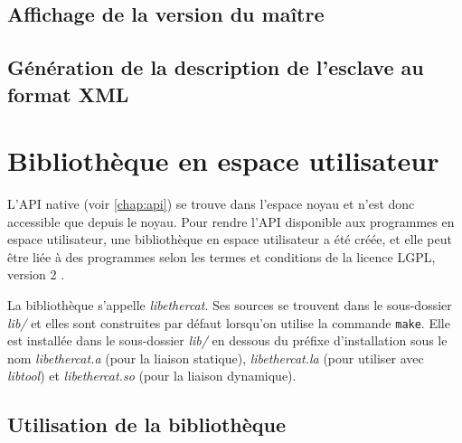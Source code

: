 \documentclass[a4paper,12pt,BCOR6mm,bibtotoc,idxtotoc]{scrbook}
\begin{document}



\subsection{Affichage de la version du ma\^itre}




\subsection{G\'en\'eration de la description de l'esclave au format XML}




\section{Biblioth\`eque en espace utilisateur}
\label{sec:userlib}

L'API native (voir \autoref{chap:api}) se trouve dans l'espace noyau
et n'est donc accessible que depuis le noyau.
Pour rendre l'API disponible aux programmes en espace utilisateur,
une biblioth\`eque en espace utilisateur a \'et\'e cr\'e\'ee, et elle
peut \^etre li\'ee \`a des programmes selon les termes et conditions
de la licence LGPL, version 2 \cite{lgpl}.

La biblioth\`eque s'appelle \textit{libethercat}.  Ses sources se
trouvent dans le sous-dossier \textit{lib/} et elles sont construites
par d\'efaut lorsqu'on utilise la commande \lstinline+make+. Elle est
install\'ee dans le sous-dossier \textit{lib/} en dessous du pr\'efixe
d'installation sous le nom \textit{libethercat.a} (pour la liaison
statique), \textit{libethercat.la} (pour utiliser avec
\textit{libtool}) et \textit{libethercat.so} (pour la liaison
dynamique).

\subsection{Utilisation de la biblioth\`eque}
\end{document}

